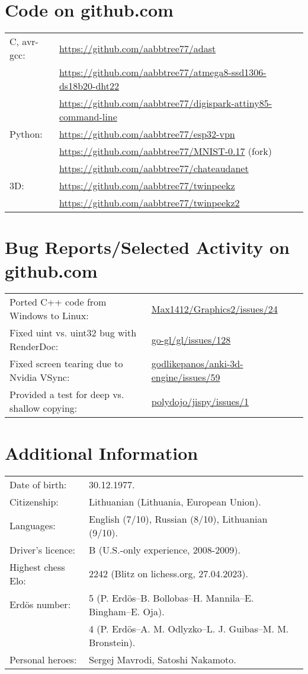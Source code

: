 \documentclass[a4paper,11pt]{article}
\begin{document}
\section{Code on github.com}
\begin{tabular}{ll}
C, avr-gcc: & \url{https://github.com/aabbtree77/adast}\\
& \url{https://github.com/aabbtree77/atmega8-ssd1306-ds18b20-dht22}\\
& \url{https://github.com/aabbtree77/digispark-attiny85-command-line}\\
Python: & \url{https://github.com/aabbtree77/esp32-vpn}\\
& \url{https://github.com/aabbtree77/MNIST-0.17} (fork)\\
& \url{https://github.com/aabbtree77/chateaudanet}\\
3D: & \url{https://github.com/aabbtree77/twinpeekz}\\
    & \url{https://github.com/aabbtree77/twinpeekz2}
\end{tabular}
%
\section{Bug Reports/Selected Activity on github.com}
\begin{tabular}{ll}
Ported C++ code from Windows to Linux: & \url{Max1412/Graphics2/issues/24}\\
Fixed uint vs. uint32 bug with RenderDoc: & \url{go-gl/gl/issues/128}\\
Fixed screen tearing due to Nvidia VSync: & \url{godlikepanos/anki-3d-engine/issues/59}\\
Provided a test for deep vs. shallow copying: & \url{polydojo/jispy/issues/1}
\end{tabular}
%
\section{Additional Information}
%
\begin{tabular}{ll}
		Date of birth: & 30.12.1977.\\
		Citizenship: & Lithuanian (Lithuania, European Union).\\
        Languages: & English (7/10), Russian (8/10), Lithuanian (9/10).\\
        Driver's licence:& B (U.S.-only experience, 2008-2009).\\
        Highest chess Elo:& 2242 (Blitz on lichess.org, 27.04.2023).\\
        Erd\"{o}s number: & 5 (P. Erd\"{o}s--B. Bollobas--H. Mannila--E. Bingham--E. Oja).\\
                          & 4 (P. Erd\"{o}s--A. M. Odlyzko--L. J. Guibas--M. M. Bronstein).\\
    Personal heroes: & Sergej Mavrodi, Satoshi Nakamoto.
\end{tabular}
%

\end{document}
